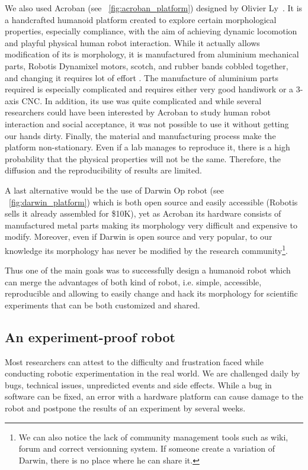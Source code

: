 We also used Acroban (see \figurename~\ref{fig:acroban_platform}) designed by Olivier Ly~\parencite{Ly2010}. It is a handcrafted humanoid platform created to explore certain morphological properties, especially compliance, with the aim of achieving dynamic locomotion and playful physical human robot interaction.
While it actually allows modification of its is morphology, it is manufactured from aluminium mechanical parts, Robotis Dynamixel motors, scotch, and rubber bands cobbled together, and changing it requires lot of effort . The manufacture of aluminium parts required is especially complicated and requires either very good handiwork or a 3-axis CNC.
In addition, its use was quite complicated and while several researchers could have been interested by Acroban to study human robot interaction and social acceptance, it was not possible to use it without getting our hands dirty.
Finally, the material and manufacturing process make the platform non-stationary. Even if a lab manages to reproduce it, there is a high probability that the physical properties will not be the same. Therefore, the diffusion and the reproducibility of results are limited.


A last alternative would be the use of Darwin Op robot (see \figurename~\ref{fig:darwin_platform}) which is both open source and easily accessible (Robotis sells it already assembled for \$10K), yet as Acroban its hardware consists of manufactured metal parts making its morphology very difficult and expensive to modify. Moreover, even if Darwin is open source and very popular, to our knowledge its morphology has never be modified by the research community\footnote{We can also notice the lack of community management tools such as wiki, forum and correct versionning system. If someone create a variation of Darwin, there is no place where he can share it.}.

Thus one of the main goals was to successfully design a humanoid robot which can merge the advantages of both kind of robot, i.e. simple, accessible, reproducible and allowing to easily change and hack its morphology for scientific experiments that can be both customized and shared.

\subsection{An experiment-proof robot} %
\label{sec:experiment-proof}

Most researchers can attest to the difficulty and frustration faced while conducting robotic experimentation in the real world. We are challenged daily by bugs, technical issues, unpredicted events and side effects. While a bug in software can be fixed, an error with a hardware platform can cause damage to the robot and postpone the results of an experiment by several weeks.

